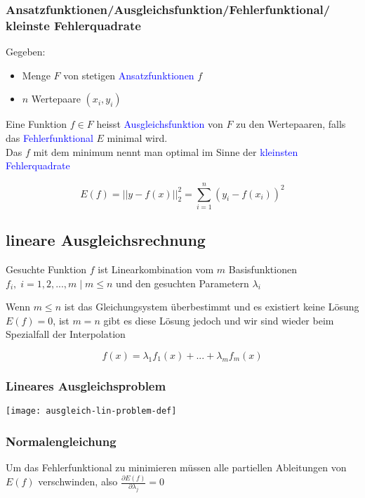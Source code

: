 \subsubsection{Ansatzfunktionen/Ausgleichsfunktion/Fehlerfunktional/
	kleinste Fehlerquadrate}

Gegeben:
\begin{itemize}
	\item Menge $F$ von stetigen \textcolor{blue}{Ansatzfunktionen} $f$
	\item $n$ Wertepaare $(x_i,y_i)$
\end{itemize}

Eine Funktion $f \in F$ heisst \textcolor{blue}{Ausgleichsfunktion} von $F$ zu
den Wertepaaren, falls das \textcolor{blue}{Fehlerfunktional} $E$ minimal wird.\\
Das $f$ mit dem minimum nennt man optimal im Sinne der \textcolor{blue}{kleinsten
Fehlerquadrate}


{\large
$$E(f) = ||y-f(x)||^2_2 = \sum^n_{i=1}(y_i - f(x_i))^2$$
}




\subsection{lineare Ausgleichsrechnung}

Gesuchte Funktion $f$ ist Linearkombination vom $m$ Basisfunktionen $f_i,
	\; i = 1,2,...,m \; | \; m \le n$ und den gesuchten Parametern $\lambda_i$

Wenn $m \le n$ ist das Gleichungsystem überbestimmt und es existiert keine Lösung
$E(f) = 0$, ist $m = n$ gibt es diese Lösung jedoch und wir sind wieder beim
Spezialfall der Interpolation

$$f(x) = \lambda_1 f_1(x) + ... + \lambda_m f_m(x)$$

\subsubsection{Lineares Ausgleichsproblem}
\texttt{[image: ausgleich-lin-problem-def]}


\subsubsection{Normalengleichung}

Um das Fehlerfunktional zu minimieren müssen alle partiellen Ableitungen von
$E(f)$ verschwinden, also {\Large $\frac{\partial E(f)}{\partial \lambda_j} = 0$}


